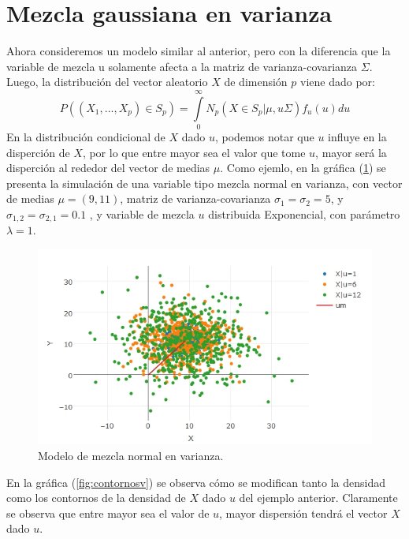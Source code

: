 \section{Mezcla gaussiana en varianza}
Ahora consideremos un modelo similar al anterior, pero con la diferencia que la variable de mezcla u solamente afecta a la matriz de varianza-covarianza $\Sigma$. Luego, la distribución del vector aleatorio $X$ de dimensión $p$ viene dado por:
\begin{equation}
P\left( (X_{1},...,X_{p})\in S_{p} \right )=\underset{0}{\overset{\infty }{\int }}N_{p}(X\in S_{p}|\mu,u\Sigma)f_{u}(u)du 
\end{equation}
En la distribución condicional de $X$ dado $u$, podemos notar que $u$ influye en la disperción de $X$, por lo que entre mayor sea el valor que tome $u$, mayor será la disperción al rededor del vector de medias $\mu$. Como ejemlo, en la gráfica (\ref{fig:mez}) se presenta la simulación de una variable tipo mezcla normal en varianza, con vector de medias $\mu=(9,11)$, matriz de varianza-covarianza $\sigma_{1}=\sigma_{2}=5$, y $\sigma_{1,2}=\sigma_{2,1}=0.1$
, y variable de mezcla $u$ distribuida Exponencial, con parámetro $\lambda=1$.\\      


\begin{figure}[h!]
	\centering
	\includegraphics[width=1\linewidth]{Figuras/gvcarregida}
	\caption{Modelo de mezcla normal en varianza.}
	\label{fig:mez}
\end{figure}

\pagebreak
En la gráfica (\ref{fig:contornosv}) se observa cómo se modifican tanto la densidad como los contornos de la densidad de $X$ dado $u$ del ejemplo anterior. Claramente se observa que entre mayor sea el valor de $u$, mayor dispersión tendrá el vector $X$ dado $u$.



